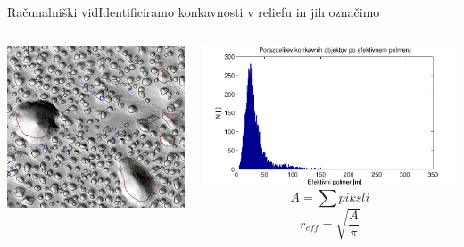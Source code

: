 \documentclass{beamer}
\begin{document}
\begin{frame}{Računalniški vid}{Identificiramo konkavnosti v reliefu in jih označimo}
\begin{columns}
  \begin{column}{0.55\textwidth}
    \hspace*{0.02\textwidth}\includegraphics[width=\textwidth]{slike/menisija-vrtace}
  \end{column}

  \begin{column}{0.7\textwidth}
    \hspace*{-0.025\textwidth}\includegraphics[width=\textwidth]{slike/menisija-polmeri-hist}
    \footnotesize
    \[ A = \sum piksli\]
    \[ r_{eff} = \sqrt{\frac{A}{\pi}} \]
  \end{column}
\end{columns}
\end{frame}
\end{document}
